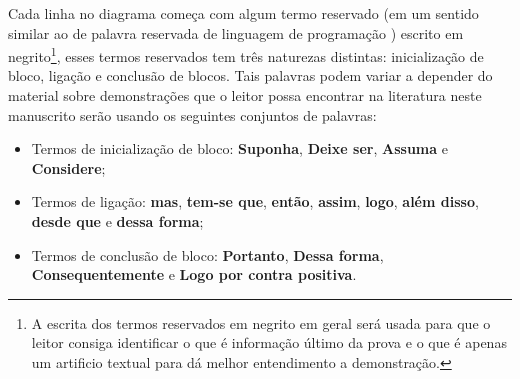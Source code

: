 Cada linha no diagrama começa com algum termo reservado (em um sentido similar ao de palavra reservada de linguagem de programação \cite{aho2007, cooper2017}) escrito em negrito\footnote{A escrita dos termos reservados em negrito em geral será usada para que o leitor consiga identificar o que é informação último da prova e o que é apenas um artificio textual para dá melhor entendimento a demonstração.}, esses termos reservados tem três naturezas distintas: inicialização de bloco, ligação e conclusão de blocos. Tais palavras podem variar a depender do material sobre demonstrações que o leitor possa encontrar na literatura neste manuscrito serão usando os seguintes conjuntos de palavras:

\begin{itemize}
	\item Termos de inicialização de bloco: \textbf{Suponha}, \textbf{Deixe ser}, \textbf{Assuma} e \textbf{Considere};
	\item Termos de ligação: \textbf{mas}, \textbf{tem-se que}, \textbf{então}, \textbf{assim}, \textbf{logo}, \textbf{além disso}, \textbf{desde que} e \textbf{dessa forma};
	\item Termos de conclusão de bloco: \textbf{Portanto}, \textbf{Dessa forma}, \textbf{Consequentemente} e \textbf{Logo por contra positiva}.
\end{itemize}  


